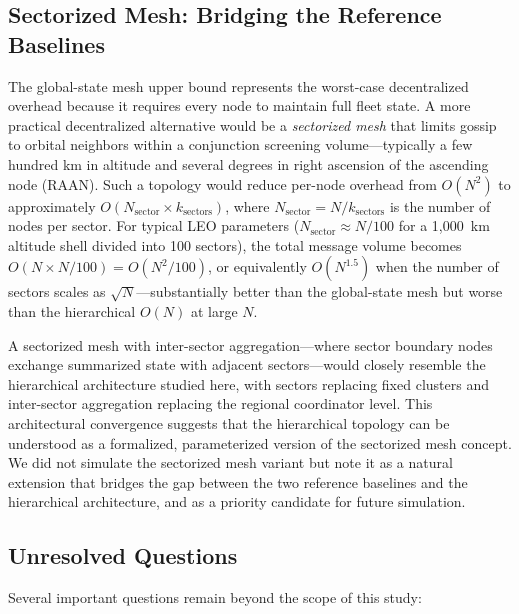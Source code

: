 \documentclass[journal]{IEEEtran}
\begin{document}
\subsection{Sectorized Mesh: Bridging the Reference Baselines}
\label{sec:sectorized_mesh}

The global-state mesh upper bound represents the worst-case decentralized overhead because it requires every node to maintain full fleet state. A more practical decentralized alternative would be a \emph{sectorized mesh} that limits gossip to orbital neighbors within a conjunction screening volume---typically a few hundred km in altitude and several degrees in right ascension of the ascending node (RAAN). Such a topology would reduce per-node overhead from $O(N^2)$ to approximately $O(N_{\text{sector}} \times k_{\text{sectors}})$, where $N_{\text{sector}} = N / k_{\text{sectors}}$ is the number of nodes per sector. For typical LEO parameters ($N_{\text{sector}} \approx N/100$ for a 1{,}000~km altitude shell divided into 100 sectors), the total message volume becomes $O(N \times N/100) = O(N^2/100)$, or equivalently $O(N^{1.5})$ when the number of sectors scales as $\sqrt{N}$---substantially better than the global-state mesh but worse than the hierarchical $O(N)$ at large $N$.

A sectorized mesh with inter-sector aggregation---where sector boundary nodes exchange summarized state with adjacent sectors---would closely resemble the hierarchical architecture studied here, with sectors replacing fixed clusters and inter-sector aggregation replacing the regional coordinator level. This architectural convergence suggests that the hierarchical topology can be understood as a formalized, parameterized version of the sectorized mesh concept. We did not simulate the sectorized mesh variant but note it as a natural extension that bridges the gap between the two reference baselines and the hierarchical architecture, and as a priority candidate for future simulation.

\subsection{Unresolved Questions}

Several important questions remain beyond the scope of this study:
\end{document}
